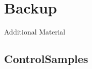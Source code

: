 \documentclass{beamer}
\begin{document}
\section{Backup}
\begin{frame}
  \begin{center}
    {\Large Additional Material}
  \end{center}
\end{frame}


\subsection{ControlSamples}
\begin{frame}
\tiny
\begin{tabular}{lrrr}
\toprule


\end{tabular}
\end{frame}
\end{document}
